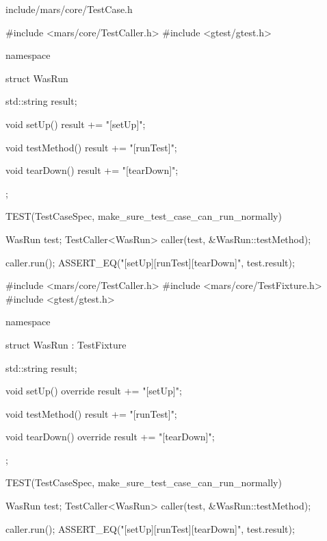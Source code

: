 \begin{diff}{include/mars/core/TestCase.h}
\begin{minicpp}
#include <mars/core/TestCaller.h>
#include <gtest/gtest.h>

namespace {
  struct WasRun {
    std::string result;

    void setUp() {
      result += "[setUp]";
    }

    void testMethod() {
      result += "[runTest]";
    }

    void tearDown() {
      result += "[tearDown]";
    }
  };
}

TEST(TestCaseSpec, make_sure_test_case_can_run_normally) {
  WasRun test;
  TestCaller<WasRun> caller(test, &WasRun::testMethod);

  caller.run();
  ASSERT_EQ("[setUp][runTest][tearDown]", test.result);
}
\end{minicpp}
\tcblower
\begin{minicpp}
#include <mars/core/TestCaller.h>
#include <mars/core/TestFixture.h>
#include <gtest/gtest.h>

namespace {
  struct WasRun : TestFixture {
    std::string result;

    void setUp() override {
      result += "[setUp]";
    }

    void testMethod() {
      result += "[runTest]";
    }

    void tearDown() override {
      result += "[tearDown]";
    }
  };
}

TEST(TestCaseSpec, make_sure_test_case_can_run_normally) {
  WasRun test;
  TestCaller<WasRun> caller(test, &WasRun::testMethod);

  caller.run();
  ASSERT_EQ("[setUp][runTest][tearDown]", test.result);
}
\end{minicpp}
\end{diff}